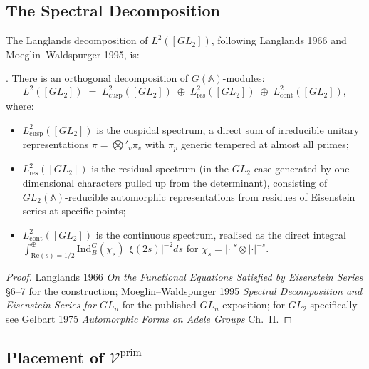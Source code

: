 \subsection{The Spectral Decomposition}
\label{v4-arith:kms-gns:cycle3:spectral}

The Langlands decomposition of \(L^{2}([GL_{2}])\), following
Langlands 1966 and Moeglin--Waldspurger 1995, is:

\begin{theorem}
\label{v4-arith:kms-gns:thm:spectral-decomposition}
\ClaimStatusProvedElsewhere. There is an orthogonal decomposition of
\(G(\mathbb{A})\)-modules:
\begin{equation}
\label{v4-arith:kms-gns:eq:L2-decomposition}
L^{2}([GL_{2}])\;=\;L^{2}_{\mathrm{cusp}}([GL_{2}])\;\oplus\;L^{2}_{\mathrm{res}}([GL_{2}])\;\oplus\;L^{2}_{\mathrm{cont}}([GL_{2}]),
\end{equation}
where:
\begin{itemize}
\item \(L^{2}_{\mathrm{cusp}}([GL_{2}])\) is the cuspidal spectrum,
a direct sum of irreducible unitary representations
\(\pi=\bigotimes'_{v}\pi_{v}\) with \(\pi_{p}\) generic tempered at
almost all primes;
\item \(L^{2}_{\mathrm{res}}([GL_{2}])\) is the residual spectrum
(in the \(GL_{2}\) case generated by one-dimensional characters
pulled up from the determinant), consisting of \(GL_{2}(\mathbb{A})\)-reducible
automorphic representations from residues of Eisenstein series at
specific points;
\item \(L^{2}_{\mathrm{cont}}([GL_{2}])\) is the continuous spectrum,
realised as the direct integral
\(\int^{\oplus}_{\mathrm{Re}(s)=1/2}\mathrm{Ind}_{B}^{G}(\chi_{s})\,|\xi(2s)|^{-2}ds\)
for \(\chi_{s}=|\cdot|^{s}\otimes|\cdot|^{-s}\).
\end{itemize}
\end{theorem}

\begin{proof}
Langlands 1966 \emph{On the Functional Equations Satisfied by
Eisenstein Series} \S6--7 for the construction; Moeglin--Waldspurger
1995 \emph{Spectral Decomposition and Eisenstein Series for \(GL_{n}\)}
for the published \(GL_{n}\) exposition; for \(GL_{2}\) specifically see
Gelbart 1975 \emph{Automorphic Forms on Adele Groups} Ch.~II.
\end{proof}

\subsection{Placement of \(\mathcal{V}^{\mathrm{prim}}\)}
\label{v4-arith:kms-gns:cycle3:placement}

